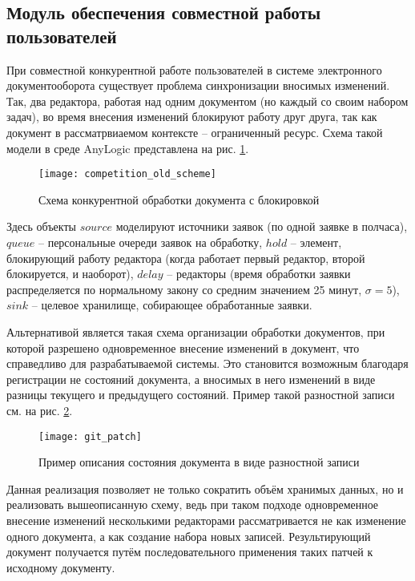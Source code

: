 \subsection{Модуль обеспечения совместной работы пользователей} \label{research_competition}

При совместной конкурентной работе пользователей в системе электронного документооборота существует проблема синхронизации вносимых изменений. Так, два редактора, работая над одним документом (но каждый со своим набором задач), во время внесения изменений блокируют работу друг друга, так как документ в рассматрвиаемом контексте -- ограниченный ресурс. Схема такой модели в среде AnyLogic представлена на рис. \ref{img:competition_old_scheme}.

\begin{figure}[h!]
  \centering
  \texttt{[image: competition\_old\_scheme]}
  \caption{Схема конкурентной обработки документа с блокировкой}
  \label{img:competition_old_scheme}
\end{figure}

Здесь объекты $source$ моделируют источники заявок (по одной заявке в полчаса), $queue$ -- персональные очереди заявок на обработку, $hold$ -- элемент, блокирующий работу редактора (когда работает первый редактор, второй блокируется, и наоборот), $delay$ -- редакторы (время обработки заявки распределяется по нормальному закону со средним значением 25 минут, $\sigma=5$), $sink$ -- целевое хранилище, собирающее обработанные заявки.

\vspace{\baselineskip}
Альтернативой является такая схема организации обработки документов, при которой разрешено одновременное внесение изменений в документ, что справедливо для разрабатываемой системы. Это становится возможным благодаря регистрации не состояний документа, а вносимых в него изменений в виде разницы текущего и предыдущего состояний. Пример такой разностной записи см. на рис. \ref{img:git_patch}.

\begin{figure}[h!]
  \centering
  \texttt{[image: git\_patch]}
  \caption{Пример описания состояния документа в виде разностной записи}
  \label{img:git_patch}
\end{figure}

Данная реализация позволяет не только сократить объём хранимых данных, но и реализовать вышеописанную схему, ведь при таком подходе одновременное внесение изменений несколькими редакторами рассматривается не как изменение одного документа, а как создание набора новых записей. Результирующий документ получается путём последовательного применения таких патчей к исходному документу.

